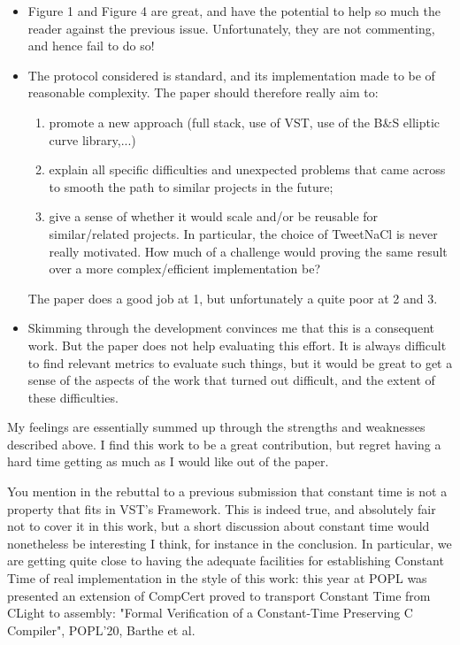 \begin{itemize}
    \item Figure 1 and Figure 4 are great, and have the potential to help so much the reader against the previous issue. Unfortunately, they are not commenting, and hence fail to do so!
    \item The protocol considered is standard, and its implementation made to be of reasonable complexity. The paper should therefore really aim to:
          \begin{enumerate}
              \item promote a new approach (full stack, use of VST, use of the B\&S elliptic curve library,...)
              \item explain all specific difficulties and unexpected problems that came across to smooth the path to similar projects in the future;
              \item give a sense of whether it would scale and/or be reusable for similar/related projects. In particular, the choice of TweetNaCl is never really motivated. How much of a challenge would proving the same result over a more complex/efficient implementation be?
          \end{enumerate}

          The paper does a good job at 1, but unfortunately a quite poor at 2 and 3.
    \item Skimming through the development convinces me that this is a consequent work. But the paper does not help evaluating this effort. It is always difficult to find relevant metrics to evaluate such things, but it would be great to get a sense of the aspects of the work that turned out difficult, and the extent of these difficulties.
\end{itemize}

\begin{center}
\end{center}
My feelings are essentially summed up through the strengths and weaknesses described above. I find this work to be a great contribution, but regret having a hard time getting as much as I would like out of the paper.

You mention in the rebuttal to a previous submission that constant time is not a property that fits in VST's Framework. This is indeed true, and absolutely fair not to cover it in this work, but a short discussion about constant time would nonetheless be interesting I think, for instance in the conclusion. In particular, we are getting quite close to having the adequate facilities for establishing Constant Time of real implementation in the style of this work: this year at POPL was presented an extension of CompCert proved to transport Constant Time from CLight to assembly:
"Formal Verification of a Constant-Time Preserving C Compiler", POPL'20, Barthe et al.

